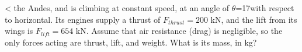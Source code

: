  <%
the Andes, and is climbing at constant speed, at an angle of
$\theta $=17\degunit with respect to horizontal.  Its engines
supply a thrust of $F_{thrust}=200$ kN, and the lift from
its wings is $F_{lift}=654$ kN.  Assume that air resistance
(drag) is negligible, so the only forces acting are thrust,
lift, and weight.  What is its mass, in kg?
